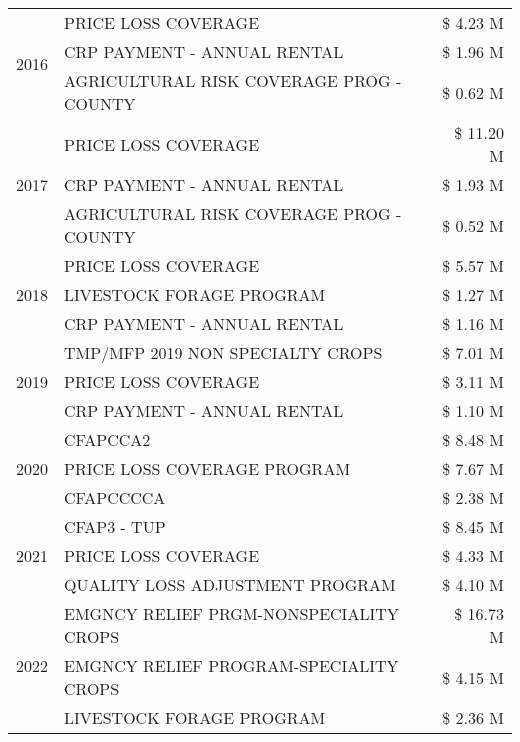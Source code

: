 \begin{tabular}{llr}
\cline{1-3}
\multirow[t]{3}{*}{2016} & PRICE LOSS COVERAGE & \$ 4.23 M \\
 & CRP PAYMENT - ANNUAL RENTAL & \$ 1.96 M \\
 & AGRICULTURAL RISK COVERAGE PROG - COUNTY & \$ 0.62 M \\
\cline{1-3}
\multirow[t]{3}{*}{2017} & PRICE LOSS COVERAGE & \$ 11.20 M \\
 & CRP PAYMENT - ANNUAL RENTAL & \$ 1.93 M \\
 & AGRICULTURAL RISK COVERAGE PROG - COUNTY & \$ 0.52 M \\
\cline{1-3}
\multirow[t]{3}{*}{2018} & PRICE LOSS COVERAGE & \$ 5.57 M \\
 & LIVESTOCK FORAGE PROGRAM & \$ 1.27 M \\
 & CRP PAYMENT - ANNUAL RENTAL & \$ 1.16 M \\
\cline{1-3}
\multirow[t]{3}{*}{2019} & TMP/MFP 2019 NON SPECIALTY CROPS & \$ 7.01 M \\
 & PRICE LOSS COVERAGE & \$ 3.11 M \\
 & CRP PAYMENT - ANNUAL RENTAL & \$ 1.10 M \\
\cline{1-3}
\multirow[t]{3}{*}{2020} & CFAPCCA2 & \$ 8.48 M \\
 & PRICE LOSS COVERAGE PROGRAM & \$ 7.67 M \\
 & CFAPCCCCA & \$ 2.38 M \\
\cline{1-3}
\multirow[t]{3}{*}{2021} & CFAP3 - TUP & \$ 8.45 M \\
 & PRICE LOSS COVERAGE & \$ 4.33 M \\
 & QUALITY LOSS ADJUSTMENT PROGRAM & \$ 4.10 M \\
\cline{1-3}
\multirow[t]{3}{*}{2022} & EMGNCY RELIEF PRGM-NONSPECIALITY CROPS & \$ 16.73 M \\
 & EMGNCY RELIEF PROGRAM-SPECIALITY CROPS & \$ 4.15 M \\
 & LIVESTOCK FORAGE PROGRAM & \$ 2.36 M \\
\cline{1-3}
\bottomrule
\end{tabular}
